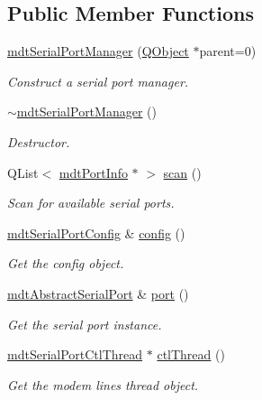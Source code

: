 \subsection*{Public Member Functions}
\begin{DoxyCompactItemize}
\item 
\hyperlink{classmdt_serial_port_manager_a6508372bcab37a73546fc2c24ee6415c}{mdt\-Serial\-Port\-Manager} (\hyperlink{class_q_object}{Q\-Object} $\ast$parent=0)
\begin{DoxyCompactList}\small\item\em Construct a serial port manager. \end{DoxyCompactList}\item 
\hyperlink{classmdt_serial_port_manager_abde2c5990f3ec7daf41ebc35b4731c1d}{$\sim$mdt\-Serial\-Port\-Manager} ()
\begin{DoxyCompactList}\small\item\em Destructor. \end{DoxyCompactList}\item 
Q\-List$<$ \hyperlink{classmdt_port_info}{mdt\-Port\-Info} $\ast$ $>$ \hyperlink{classmdt_serial_port_manager_a791572f869d1d605d0c4658ca4187260}{scan} ()
\begin{DoxyCompactList}\small\item\em Scan for available serial ports. \end{DoxyCompactList}\item 
\hyperlink{classmdt_serial_port_config}{mdt\-Serial\-Port\-Config} \& \hyperlink{classmdt_serial_port_manager_a4b8ab7b9d53966a1887d9ce8557b8416}{config} ()
\begin{DoxyCompactList}\small\item\em Get the config object. \end{DoxyCompactList}\item 
\hyperlink{classmdt_abstract_serial_port}{mdt\-Abstract\-Serial\-Port} \& \hyperlink{classmdt_serial_port_manager_aa96937c2123fe4353b948b848d3e064d}{port} ()
\begin{DoxyCompactList}\small\item\em Get the serial port instance. \end{DoxyCompactList}\item 
\hyperlink{classmdt_serial_port_ctl_thread}{mdt\-Serial\-Port\-Ctl\-Thread} $\ast$ \hyperlink{classmdt_serial_port_manager_a9dc223afc96ec7b1fce4660ac96a3fe7}{ctl\-Thread} ()
\begin{DoxyCompactList}\small\item\em Get the modem lines thread object. \end{DoxyCompactList}\end{DoxyCompactItemize}
